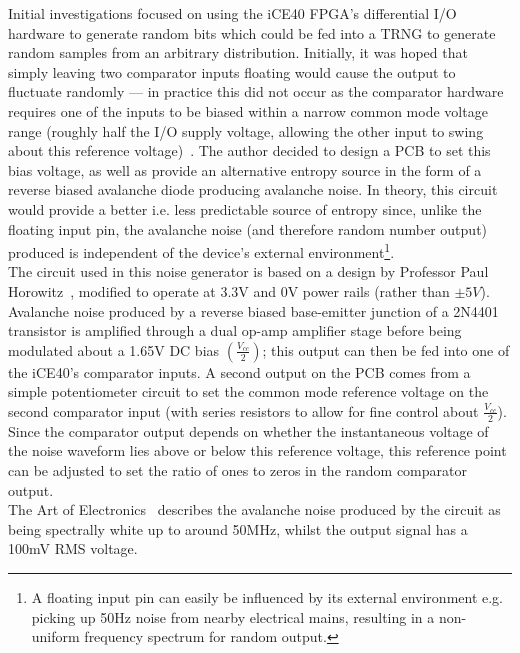 \documentclass[12pt]{article}
\begin{document}
      Initial investigations focused on using the iCE40 FPGA's differential I/O hardware to generate random bits which could be fed into a TRNG to generate random samples from an arbitrary distribution. Initially, it was hoped that simply leaving two comparator inputs floating would cause the output to fluctuate randomly --- in practice this did not occur as the comparator hardware requires one of the inputs to be biased within a narrow common mode voltage range (roughly half the I/O supply voltage, allowing the other input to swing about this reference voltage)~\cite{ice40_diff_io}. The author decided to design a PCB to set this bias voltage, as well as provide an alternative entropy source in the form of a reverse biased avalanche diode producing avalanche noise. In theory, this circuit would provide a better i.e. less predictable source of entropy since, unlike the floating input pin, the avalanche noise (and therefore random number output) produced is independent of the device's external environment\footnote{A floating input pin can easily be influenced by its external environment e.g. picking up 50Hz noise from nearby electrical mains, resulting in a non-uniform frequency spectrum for random output.}.\\

      The circuit used in this noise generator is based on a design by Professor Paul Horowitz~\cite[p.~984]{art_of_electronics}, modified to operate at 3.3V and 0V power rails (rather than $\pm5V$). Avalanche noise produced by a reverse biased base-emitter junction of a 2N4401 transistor is amplified through a dual op-amp amplifier stage before being modulated about a 1.65V DC bias $\left(\frac{V_{cc}}{2}\right)$; this output can then be fed into one of the iCE40's comparator inputs. A second output on the PCB comes from a simple potentiometer circuit to set the common mode reference voltage on the second comparator input (with series resistors to allow for fine control about $\frac{V_{cc}}{2}$). Since the comparator output depends on whether the instantaneous voltage of the noise waveform lies above or below this reference voltage, this reference point can be adjusted to set the ratio of ones to zeros in the random comparator output.\\

      The Art of Electronics~\cite[p.~984]{art_of_electronics} describes the avalanche noise produced by the circuit as being spectrally white up to around 50MHz, whilst the output signal has a 100mV RMS voltage.
\end{document}
